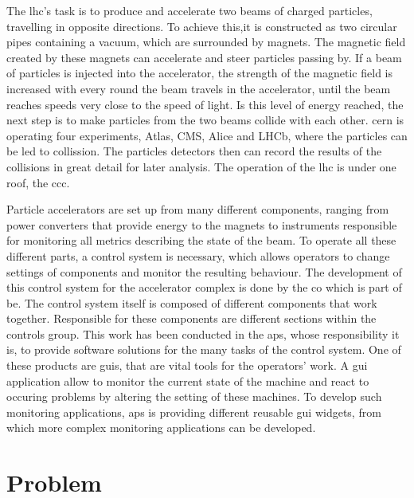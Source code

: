 The \gls{lhc}'s task is to produce and accelerate two beams of charged particles, travelling in opposite directions. To achieve this,it is constructed as two circular pipes containing a vacuum, which are surrounded by magnets. The magnetic field created by these magnets can accelerate and steer particles passing by. If a beam of particles is injected into the accelerator, the strength of the magnetic field is increased with every round the beam travels in the accelerator, until the beam reaches speeds very close to the speed of light. Is this level of energy reached, the next step is to make particles from the two beams collide with each other. \gls{cern} is operating four experiments, Atlas, CMS, Alice and LHCb, where the particles can be led to collission. The particles detectors then can record the results of the collisions in great detail for later analysis. The operation of the \gls{lhc} is under one roof, the \gls{ccc}. \cite{CernLhc, HowParticleAccsWork}


Particle accelerators are set up from many different components, ranging from power converters that provide energy to the magnets to instruments responsible for monitoring all metrics describing the state of the beam. To operate all these different parts, a control system is necessary, which allows operators to change settings of components and monitor the resulting behaviour. The development of this control system for the accelerator complex is done by the \gls{co} which is part of \gls{be}. \cite{ControlSystemBible}
The control system itself is composed of different components that work together. Responsible for these components are different sections within the controls group.
This work has been conducted in the \gls{aps}, whose responsibility it is, to provide software solutions for the many tasks of the control system. One of these products are \glspl{gui}, that are vital tools for the operators' work.
A \gls{gui} application allow to monitor the current state of the machine and react to occuring problems by altering the setting of these machines. To develop such monitoring applications, \gls{aps} is providing different reusable \gls{gui} widgets, from which more complex monitoring applications can be developed.





\section{Problem}
\label{sec:Introduction:problem}

